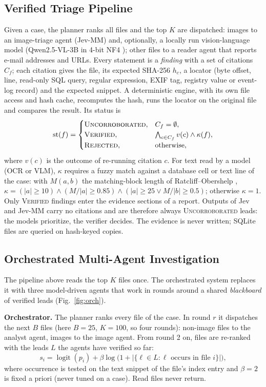 \documentclass[conference]{IEEEtran}
\newcommand{\st}[1]{\textsc{#1}}
\begin{document}
\subsection{Verified Triage Pipeline}\label{sec:pipeline}
Given a case, the planner ranks all files and the top $K$ are dispatched: images to an image-triage agent (Jev-MM)
and, optionally, a locally run vision-language model (Qwen2.5-VL-3B in 4-bit NF4 \cite{qwen25vl,qlora}); other files
to a reader agent that reports e-mail addresses and URLs. Every statement is a \emph{finding} with a set of citations
$C_f$; each citation gives the file, its expected SHA-256 $h_c$, a locator (byte offset, line, read-only SQL query,
regular expression, EXIF tag, registry value or event-log record) and the expected snippet. A deterministic engine,
with its own file access and hash cache, recomputes the hash, runs the locator on the original file and compares the
result. Its status is
\begin{equation}
\mathrm{st}(f) =
\begin{cases}
\st{Uncorroborated}, & C_f = \emptyset,\\
\st{Verified}, & \bigwedge_{c \in C_f} v(c) \wedge \kappa(f),\\
\st{Rejected}, & \text{otherwise},
\end{cases}
\label{eq:status}
\end{equation}
where $v(c)$ is the outcome of re-running citation $c$. For text read by a model (OCR or VLM), $\kappa$ requires a
fuzzy match against a database cell or text line of the case: with $M(a,b)$ the matching-block length of
Ratcliff--Obershelp \cite{ratcliff1988}, $\kappa = (|a|\ge 10) \wedge (M/|a| \ge 0.85) \wedge (|a|\ge 25 \vee M/|b|\ge
0.5)$; otherwise $\kappa=1$. Only \st{Verified} findings enter the evidence sections of a report. Outputs of Jev and
Jev-MM carry no citations and are therefore always \st{Uncorroborated} leads: the models prioritize, the verifier
decides. The evidence is never written; SQLite files are queried on hash-keyed copies.

\subsection{Orchestrated Multi-Agent Investigation}\label{sec:orch}
The pipeline above reads the top $K$ files once. The orchestrated system replaces it with three model-driven agents
that work in rounds around a shared \emph{blackboard} of verified leads (Fig.~\ref{fig:orch}).

\textbf{Orchestrator.} The planner ranks every file of the case. In round $r$ it dispatches the next $B$ files (here
$B=25$, $K=100$, so four rounds): non-image files to the analyst agent, images to the image agent. From round 2 on,
files are re-ranked with the leads $L$ the agents have verified so far:
\begin{equation}
s_i = \operatorname{logit}(p_i) + \beta \log\bigl(1 + |\{\ell \in L : \ell \text{ occurs in file } i\}|\bigr),
\label{eq:rerank}
\end{equation}
where occurrence is tested on the text snippet of the file's index entry and $\beta=2$ is fixed a priori (never tuned
on a case). Read files never return.
\end{document}

